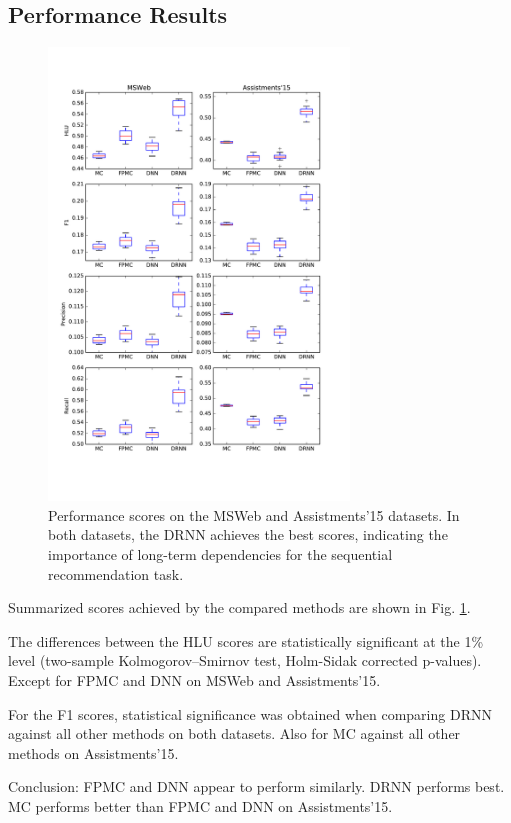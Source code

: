 \documentclass{sig-alternate-05-2015}
\begin{document}
\subsection{Performance Results}
\begin{figure}
\includegraphics[width=8cm]{images/PerfBoxplots}		
\caption{Performance scores on the MSWeb and Assistments'15 datasets. In both datasets, the DRNN achieves the best scores,  indicating the importance of long-term dependencies for the sequential recommendation task.}
\label{fig:PerfResults}
\end{figure}
Summarized scores achieved by the compared methods are shown in Fig. \ref{fig:PerfResults}. 

The differences between the HLU scores are statistically significant at the 1\% level (two-sample Kolmogorov–Smirnov test, Holm-Sidak corrected p-values). Except for FPMC and DNN on MSWeb and Assistments'15. 

For the F1 scores, statistical significance was obtained when comparing DRNN against all other methods on both datasets. Also for MC against all other methods on Assistments'15. 

Conclusion: FPMC and DNN appear to perform similarly. DRNN performs best. MC performs better than FPMC and DNN on Assistments'15. 
\end{document}
